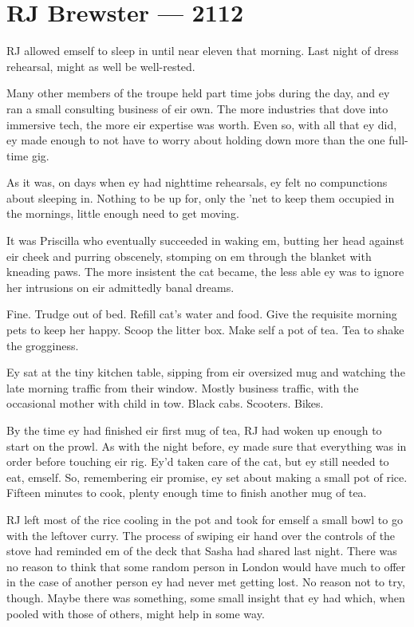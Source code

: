 \hypertarget{rj-brewster-2112}{%
\chapter*{RJ Brewster — 2112}\label{rj-brewster-2112}}

RJ allowed emself to sleep in until near eleven that morning. Last night of dress rehearsal, might as well be well-rested.

Many other members of the troupe held part time jobs during the day, and ey ran a small consulting business of eir own. The more industries that dove into immersive tech, the more eir expertise was worth. Even so, with all that ey did, ey made enough to not have to worry about holding down more than the one full-time gig.

As it was, on days when ey had nighttime rehearsals, ey felt no compunctions about sleeping in. Nothing to be up for, only the 'net to keep them occupied in the mornings, little enough need to get moving.

It was Priscilla who eventually succeeded in waking em, butting her head against eir cheek and purring obscenely, stomping on em through the blanket with kneading paws. The more insistent the cat became, the less able ey was to ignore her intrusions on eir admittedly banal dreams.

Fine. Trudge out of bed. Refill cat's water and food. Give the requisite morning pets to keep her happy. Scoop the litter box. Make self a pot of tea. Tea to shake the grogginess.

Ey sat at the tiny kitchen table, sipping from eir oversized mug and watching the late morning traffic from their window. Mostly business traffic, with the occasional mother with child in tow. Black cabs. Scooters. Bikes.

By the time ey had finished eir first mug of tea, RJ had woken up enough to start on the prowl. As with the night before, ey made sure that everything was in order before touching eir rig. Ey'd taken care of the cat, but ey still needed to eat, emself. So, remembering eir promise, ey set about making a small pot of rice. Fifteen minutes to cook, plenty enough time to finish another mug of tea.

RJ left most of the rice cooling in the pot and took for emself a small bowl to go with the leftover curry. The process of swiping eir hand over the controls of the stove had reminded em of the deck that Sasha had shared last night. There was no reason to think that some random person in London would have much to offer in the case of another person ey had never met getting lost. No reason not to try, though. Maybe there was something, some small insight that ey had which, when pooled with those of others, might help in some way.

